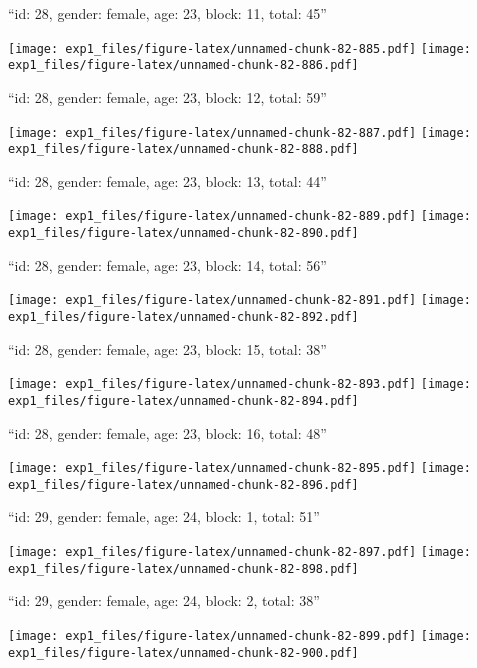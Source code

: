 \documentclass[11pt,,]{article}
\begin{document}
\newpage
[1] 

``id: 28, gender: female, age: 23, block: 11, total: 45''

\texttt{[image: exp1\_files/figure-latex/unnamed-chunk-82-885.pdf]}
\texttt{[image: exp1\_files/figure-latex/unnamed-chunk-82-886.pdf]}

\newpage
[1] 

``id: 28, gender: female, age: 23, block: 12, total: 59''

\texttt{[image: exp1\_files/figure-latex/unnamed-chunk-82-887.pdf]}
\texttt{[image: exp1\_files/figure-latex/unnamed-chunk-82-888.pdf]}

\newpage
[1] 

``id: 28, gender: female, age: 23, block: 13, total: 44''

\texttt{[image: exp1\_files/figure-latex/unnamed-chunk-82-889.pdf]}
\texttt{[image: exp1\_files/figure-latex/unnamed-chunk-82-890.pdf]}

\newpage
[1] 

``id: 28, gender: female, age: 23, block: 14, total: 56''

\texttt{[image: exp1\_files/figure-latex/unnamed-chunk-82-891.pdf]}
\texttt{[image: exp1\_files/figure-latex/unnamed-chunk-82-892.pdf]}

\newpage
[1] 

``id: 28, gender: female, age: 23, block: 15, total: 38''

\texttt{[image: exp1\_files/figure-latex/unnamed-chunk-82-893.pdf]}
\texttt{[image: exp1\_files/figure-latex/unnamed-chunk-82-894.pdf]}

\newpage
[1] 

``id: 28, gender: female, age: 23, block: 16, total: 48''

\texttt{[image: exp1\_files/figure-latex/unnamed-chunk-82-895.pdf]}
\texttt{[image: exp1\_files/figure-latex/unnamed-chunk-82-896.pdf]}

\newpage
[1] 

``id: 29, gender: female, age: 24, block: 1, total: 51''

\texttt{[image: exp1\_files/figure-latex/unnamed-chunk-82-897.pdf]}
\texttt{[image: exp1\_files/figure-latex/unnamed-chunk-82-898.pdf]}

\newpage
[1] 

``id: 29, gender: female, age: 24, block: 2, total: 38''

\texttt{[image: exp1\_files/figure-latex/unnamed-chunk-82-899.pdf]}
\texttt{[image: exp1\_files/figure-latex/unnamed-chunk-82-900.pdf]}
\end{document}
